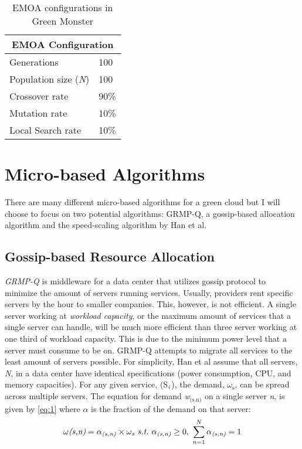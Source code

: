 \documentclass{sig-alternate}
\begin{document}
\begin{table}[tb]
\begin{center}
\begin{tabular}{|l|l|}
    \hline
    \multicolumn{2}{|c|}{\textbf{EMOA Configuration}} \\
    \hline
    Generations & 100 \\
    Population size (\emph{N}) & 100 \\
    Crossover rate & 90\% \\
    Mutation rate & 10\% \\
    Local Search rate & 10\% \\
    \hline
\end{tabular}
\caption{EMOA configurations in Green Monster}
\label{tab:EMOAConfig}
\end{center}
\end{table}



\section{Micro-based Algorithms} 
\label{sec:MicAl}

There are many different micro-based algorithms for a green cloud but I will choose to focus on two potential algorithms: GRMP-Q, a gossip-based allocation algorithm and the speed-scaling algorithm by Han et al. 

\subsection{Gossip-based Resource Allocation}
\label{sec:GBRA}
\emph{GRMP-Q} is middleware for a data center that utilizes gossip protocol to minimize the amount of servers running services. Usually, providers rent specific servers by the hour to smaller companies. This, however, is not efficient. A single server working at  \emph{workload capacity}, or the maximum amount of services that a single server can handle, will be much more efficient than three server working at one third of workload capacity. This is due to the minimum power level that a server must consume to be on. GRMP-Q attempts to migrate all services to the least amount of servers possible.  For simplicity, Han et al assume that all servers, \emph{N}, in a data center have identical specifications (power consumption, CPU, and memory capacities). For any given service, (S$_{\text{\emph{i}}}$), the demand, \emph{$\omega_{\text{s}}$}, can be spread across multiple servers. The equation for demand \emph{w$_{\text{(s,n)}}$} on a single server \emph{n}, is given by \eqref{eq:1} where \emph{$\alpha$} is the fraction of the demand on that server:
\begin{equation}
\omega\emph{(s,n)} = \alpha_\emph{(s,n)} \times \omega_\emph{s} \text{\emph{~s.t.~}} \alpha_\emph{(s,n)} \geq 0,~ \sum_{n=1}^{N} \alpha_\emph{(s,n)} = 1 \label{eq:1}
\end{equation}
\end{document}
